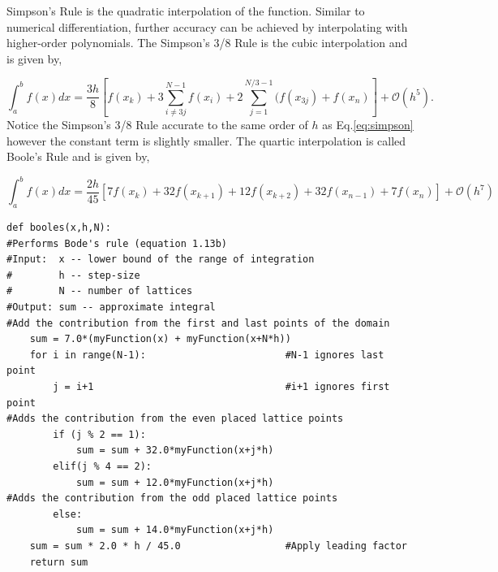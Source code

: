 \documentclass[10pt]{article}
\begin{document}
Simpson's Rule is the quadratic interpolation of the function. Similar to numerical differentiation, further accuracy can be achieved by interpolating with higher-order polynomials. The Simpson's 3/8 Rule is the cubic interpolation and is given by,

\begin{equation}
	\label{eq:simpson3/8}
	\int^b_a f(x)dx = \frac{3h}{8}[f(x_k)+3\sum^{N-1}_{i\neq 3j} f(x_i) + 2\sum^{N/3-1}_{j=1} (f(x_{3j})+f(x_n)] + \mathcal{O}(h^5).
\end{equation}
Notice the Simpson's 3/8 Rule accurate to the same order of $h$ as Eq.\ref{eq:simpson} however the constant term is slightly smaller. The quartic interpolation is called Boole's Rule and is given by,

\begin{equation}
	\label{eq:boole}
	\int^b_a f(x)dx = \frac{2h}{45}[ 7f(x_k)+32f(x_{k+1})+12f(x_{k+2})+32f(x_{n-1})+7f(x_n)] + \mathcal{O}(h^7)
\end{equation}

\begin{lstlisting}
def booles(x,h,N):
#Performs Bode's rule (equation 1.13b)
#Input:  x -- lower bound of the range of integration
#        h -- step-size
#        N -- number of lattices
#Output: sum -- approximate integral 
#Add the contribution from the first and last points of the domain
    sum = 7.0*(myFunction(x) + myFunction(x+N*h))
    for i in range(N-1):						#N-1 ignores last point
        j = i+1        						    #i+1 ignores first point
#Adds the contribution from the even placed lattice points        
        if (j % 2 == 1):
            sum = sum + 32.0*myFunction(x+j*h)
        elif(j % 4 == 2):
            sum = sum + 12.0*myFunction(x+j*h)
#Adds the contribution from the odd placed lattice points            
        else:
            sum = sum + 14.0*myFunction(x+j*h)                    
    sum = sum * 2.0 * h / 45.0                  #Apply leading factor
    return sum
\end{lstlisting}
\end{document}
